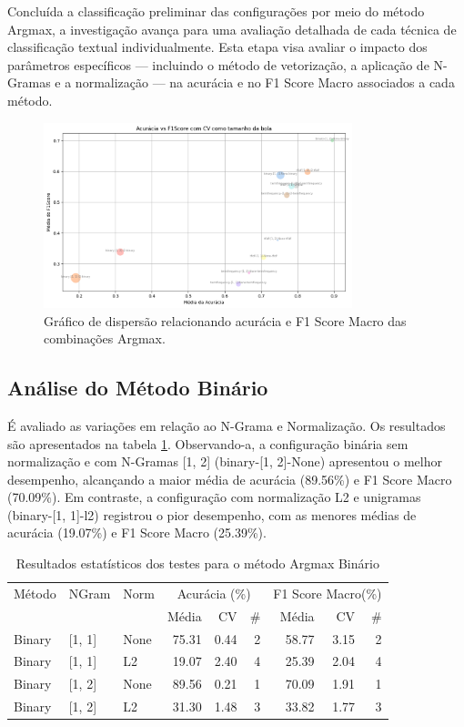Concluída a classificação preliminar das configurações por meio do método Argmax, a investigação avança para uma avaliação detalhada de cada técnica de classificação textual individualmente. Esta etapa visa avaliar o impacto dos parâmetros específicos — incluindo o método de vetorização, a aplicação de N-Gramas e a normalização — na acurácia e no F1 Score Macro associados a cada método.

\begin{figure}[H]
    \centering
    \includegraphics[width=0.8\textwidth]{images/ArgmaxScatterTodos.png}
    \caption{Gráfico de dispersão relacionando acurácia e F1 Score Macro das combinações Argmax.}
    \label{fig:scatter_acuracia_f1score}
\end{figure}

\subsection{Análise do Método Binário}

É avaliado as variações em relação ao N-Grama e Normalização.  Os resultados são apresentados na tabela \ref{tab:resultado_binario}.  Observando-a, a configuração binária sem normalização e com N-Gramas [1, 2] (binary-[1, 2]-None) apresentou o melhor desempenho, alcançando a maior média de acurácia (89.56\%) e F1 Score Macro (70.09\%). Em contraste, a configuração com normalização L2 e unigramas (binary-[1, 1]-l2) registrou o pior desempenho, com as menores médias de acurácia (19.07\%) e F1 Score Macro (25.39\%).

\begin{table}[H]
\centering
\caption{Resultados estatísticos dos testes para o método Argmax Binário}
\label{tab:resultado_binario}
\footnotesize %
\begin{tabular}{lllrrrrrr}
\hline
Método & NGram & Norm & \multicolumn{3}{c}{Acurácia (\%)} & \multicolumn{3}{c}{F1 Score Macro(\%)} \\
& & & Média & CV & \# & Média & CV & \# \\
\hline
Binary & [1, 1] & None & 75.31 & 0.44 & 2 & 58.77 & 3.15 & 2 \\
Binary & [1, 1] & L2 & 19.07 & 2.40 & 4 & 25.39 & 2.04 & 4 \\
Binary & [1, 2] & None & 89.56 & 0.21 & 1 & 70.09 & 1.91 & 1 \\
Binary & [1, 2] & L2 & 31.30 & 1.48 & 3 & 33.82 & 1.77 & 3 \\
\hline
\end{tabular}
\end{table}

